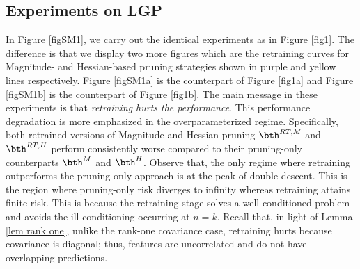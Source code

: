 \subsection{Experiments on LGP}
In Figure \ref{figSM1}, we carry out the identical experiments as in Figure \ref{fig1}. The difference is that we display two more figures which are the retraining curves for Magnitude- and Hessian-based pruning strategies shown in purple and yellow lines respectively. Figure \ref{figSM1a} is the counterpart of Figure \ref{fig1a} and Figure \ref{figSM1b} is the counterpart of Figure \ref{fig1b}. The main message in these experiments is that \emph{retraining hurts the performance}. This performance degradation is more emphasized in the overparameterized regime. Specifically, both retrained versions of Magnitude and Hessian pruning $\bth^{RT,M}$ and $\bth^{RT,H}$ perform consistently worse compared to their pruning-only counterparts $\bth^{M}$ and $\bth^{H}$. Observe that, the only regime where retraining outperforms the pruning-only approach is at the peak of double descent. This is the region where pruning-only risk diverges to infinity whereas retraining attains finite risk. This is because the retraining stage solves a well-conditioned problem and avoids the ill-conditioning occurring at $n=k$. Recall that, in light of Lemma \ref{lem rank one}, unlike the rank-one covariance case, retraining hurts because covariance is diagonal; thus, features are uncorrelated and do not have overlapping predictions.


